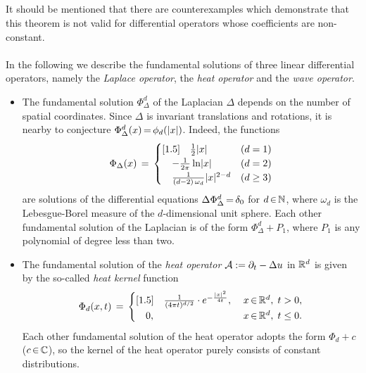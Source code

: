 \documentclass[11pt,twoside]{article}
\begin{document}
\subparagraph{}
It should be mentioned 
that there are counterexamples which demonstrate
that this theorem is not valid for differential operators
whose coefficients are non-constant.

\paragraph{} %
In the following we describe the fundamental solutions
of three linear differential operators,
namely
the \textit{Laplace operator},
the \textit{heat operator} and
the \textit{wave operator}.

\begin{itemize}[leftmargin=4mm]
\item[1.]
The fundamental solution $\Phi_{\Delta}^d$ of the Laplacian $\Delta$
depends on the number of spatial coordinates.
Since $\Delta$ is invariant {\wrt} translations and rotations,
it is nearby to conjecture $\Phi_{\Delta}^d(x) \eq \phi_d(\abs{x} )$.
Indeed,
the functions 
\[
\Phi_{\Delta}(x) \=
\begin{cases}[1.5]
\quad \frac{1}{2} \abs{x}                         & (d=1)      \\
\quad - \frac{1}{2 \pi} \ln \abs{x}               & (d=2)      \\
\quad \frac{1}{(d-2) \, \omega_d } \abs{x} ^{2-d} & (d \geq 3) \\
\end{cases}
\]
are solutions of the differential equations
$\Delta \Phi_{\Delta}^d {\,=\,} \delta_0$ for $d {\,\in\,} {\mathbb{N}}$,
where $\omega_d$ is the Lebesgue-Borel measure of
the $d$-dimensional unit sphere.
Each other fundamental solution of the Laplacian is of the form
$\Phi_{\Delta}^d + P_1$,
where $P_1$ is any polynomial of degree less than two.

\item[2.]
The fundamental solution of the \textit{heat operator} 
${\mathcal{A}} := \partial_t - \Delta u$ in ${\mathbb{R}}^d$ is given 
by the so-called \textit{heat kernel} function
\[
\Phi_d(x,t) \=
\begin{cases}[1.5]
\quad \frac{1}{(4 \pi t)^{d/2}} \cdot e^{- \frac{\abs{x} ^2}{4t}},
         & \; x \xeof \Rd, \; t > 0,   \\
\quad 0, & \; x \xeof \Rd, \; t \leq 0.\\
\end{cases}
\]
Each other fundamental solution of the heat operator
adopts the form $\Phi_d + c$ ($c {\,\in\,} {\mathbb{C}}$),
so the kernel of the heat operator 
purely consists of constant distributions.


\end{itemize}
\end{document}
